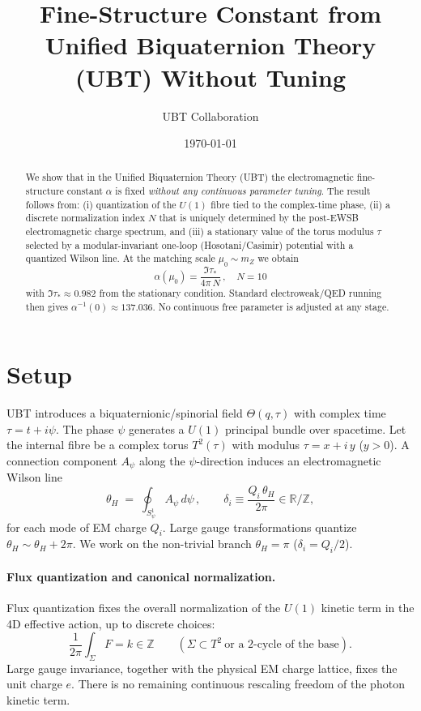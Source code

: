 \documentclass[11pt,a4paper]{article}
\title{Fine-Structure Constant from Unified Biquaternion Theory (UBT) Without Tuning}
\author{UBT Collaboration}
\date{\today}
\begin{document}
\maketitle

\begin{abstract}
We show that in the Unified Biquaternion Theory (UBT) the electromagnetic fine-structure constant \(\alpha\) is fixed \emph{without any continuous parameter tuning}. The result follows from: (i) quantization of the \(U(1)\) fibre tied to the complex-time phase, (ii) a discrete normalization index \(N\) that is uniquely determined by the post-EWSB electromagnetic charge spectrum, and (iii) a stationary value of the torus modulus \(\tau\) selected by a modular-invariant one-loop (Hosotani/Casimir) potential with a quantized Wilson line. At the matching scale \(\mu_0\sim m_Z\) we obtain
\[
\boxed{\quad \alpha(\mu_0)=\dfrac{\Im\tau_*}{4\pi\,N}\,,\quad N=10\quad}
\]
with \(\Im\tau_*\approx 0.982\) from the stationary condition. Standard electroweak/QED running then gives \(\alpha^{-1}(0)\approx 137.036\). No continuous free parameter is adjusted at any stage.
\end{abstract}

\section{Setup}
UBT introduces a biquaternionic/spinorial field \(\Theta(q,\tau)\) with complex time \(\tau=t+i\psi\). The phase \(\psi\) generates a \(U(1)\) principal bundle over spacetime. Let the internal fibre be a complex torus \(T^2(\tau)\) with modulus \(\tau=x+i\,y\) (\(y>0\)). A connection component \(A_\psi\) along the \(\psi\)-direction induces an electromagnetic Wilson line
\begin{equation}
\theta_H\;=\;\oint_{S^1_\psi}\! A_\psi\,d\psi\,,\qquad \delta_i\equiv \frac{Q_i\,\theta_H}{2\pi}\in\mathbb{R}/\mathbb{Z},
\end{equation}
for each mode of EM charge \(Q_i\). Large gauge transformations quantize \(\theta_H\sim\theta_H+2\pi\). We work on the non-trivial branch \(\theta_H=\pi\) (\(\delta_i=Q_i/2\)).

\paragraph{Flux quantization and canonical normalization.}
Flux quantization fixes the overall normalization of the \(U(1)\) kinetic term in the 4D effective action, up to discrete choices:
\begin{equation}
\frac{1}{2\pi}\int_{\Sigma} F = k\in\mathbb{Z}\qquad (\Sigma\subset T^2\ \text{or a 2-cycle of the base}).
\end{equation}
Large gauge invariance, together with the physical EM charge lattice, fixes the unit charge \(e\). There is no remaining continuous rescaling freedom of the photon kinetic term.
\end{document}
